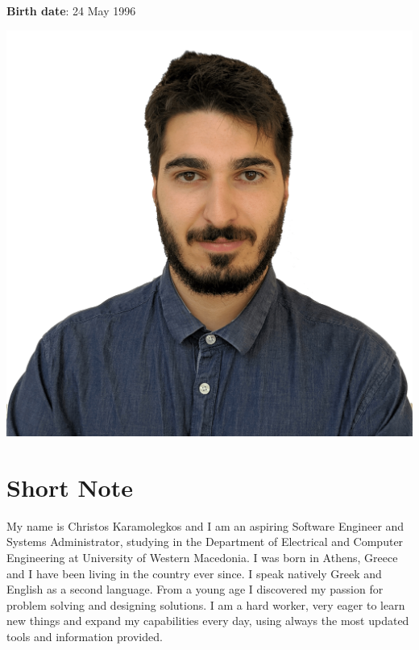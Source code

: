 \documentclass{mycv}
\begin{document}
	\pagestyle{empty}
	\begin{minipage}{.7\textwidth}
		\begin{flushleft}
			\centering
			{\bf Birth date}: 24 May 1996
		\end{flushleft}
	\end{minipage}
	\begin{minipage}{.3\textwidth}
		\begin{flushright}
			\includegraphics[scale=0.05]{../assets/christos.png}
		\end{flushright}
	\end{minipage}
	\vspace*{-0.5cm}
	\section{Short Note}
	\textnormal My name is Christos Karamolegkos and I am an aspiring Software Engineer and Systems Administrator, studying in the Department of Electrical and Computer Engineering at University of Western Macedonia. I was born in Athens, Greece and I have been living in the country ever since. I speak natively Greek and English as a second language. From a young age I discovered my passion for problem solving and designing solutions. I am a hard worker, very eager to learn new things and expand my capabilities every day, using always the most updated tools and information provided.
	
\end{document}
